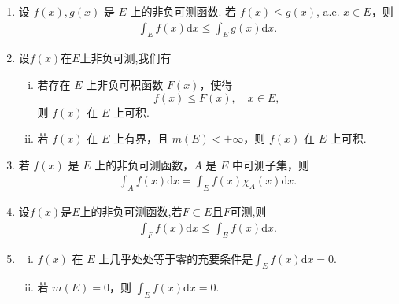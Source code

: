 \documentclass[../../main.tex]{subfiles}%
\begin{document}
\begin{theorem}[非负可测函数积分的性质]\label{theorem:非负可测函数积分的性质}
\begin{enumerate}[(1)]
\item 设 \(f(x),g(x)\) 是 \(E\) 上的非负可测函数. 若 \(f(x)\leqslant g(x)\), a.e. \(x\in E\)，则
\begin{align*}
\int_{E}f(x)\mathrm{d}x\leqslant \int_{E}g(x)\mathrm{d}x.
\end{align*}

\item 设$f(x)$在$E$上非负可测,我们有
\begin{enumerate}[(i)]
\item 若存在 \(E\) 上非负可积函数 \(F(x)\)，使得
\[f(x)\leqslant F(x),\quad x\in E,\]
则 \(f(x)\) 在 \(E\) 上可积.

\item 若 \(f(x)\) 在 \(E\) 上有界，且 \(m(E)< +\infty\)，则 \(f(x)\) 在 \(E\) 上可积.
\end{enumerate}

\item 若 \(f(x)\) 是 \(E\) 上的非负可测函数，\(A\) 是 \(E\) 中可测子集，则
\begin{align*}
\int_{A}f(x)\mathrm{d}x=\int_{E}f(x)\chi_{A}(x)\mathrm{d}x.
\end{align*}

\item 设$f(x)$是$E$上的非负可测函数,若$F\subset E$且$F$可测,则
\begin{align*}
\int_F{f\left( x \right) \mathrm{d}x}\leqslant \int_E{f\left( x \right) \mathrm{d}x}.
\end{align*}

\item \begin{enumerate}[(i)]
\item \(f(x)\) 在 \(E\) 上几乎处处等于零的充要条件是\(\int_{E}f(x)\mathrm{d}x = 0\).

\item 若 \(m(E)=0\)，则 \(\int_{E}f(x)\mathrm{d}x = 0\).
\end{enumerate}
\end{enumerate}
\end{theorem}
\end{document}
